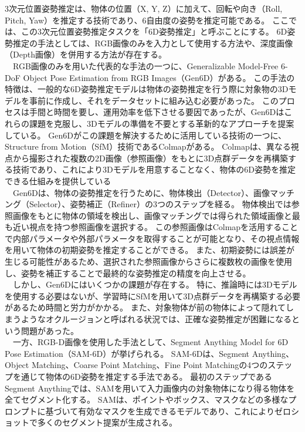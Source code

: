 3次元位置姿勢推定は、物体の位置（X, Y, Z）に加えて、回転や向き（Roll, Pitch, Yaw）を推定する技術であり、6自由度の姿勢を推定可能である。
ここでは、この3次元位置姿勢推定タスクを「6D姿勢推定」と呼ぶことにする。
6D姿勢推定の手法としては、RGB画像のみを入力として使用する方法や、深度画像（Depth画像）を併用する方法が存在する。\\
　RGB画像のみを用いた代表的な手法の一つに、Generalizable Model-Free 6-DoF Object Pose Estimation from RGB Images（Gen6D）がある。
この手法の特徴は、一般的な6D姿勢推定モデルは物体の姿勢推定を行う際に対象物の3Dモデルを事前に作成し、それをデータセットに組み込む必要があった。
このプロセスは手間と時間を要し、運用効率を低下させる要因であったが、Gen6Dはこれらの課題を克服し、3Dモデルの準備を不要とする革新的なアプローチを提案している。
Gen6Dがこの課題を解決するために活用している技術の一つに、Structure from Motion（SfM）技術であるColmapがある。
Colmapは、異なる視点から撮影された複数の2D画像（参照画像）をもとに3D点群データを再構築する技術であり、これにより3Dモデルを用意することなく、物体の6D姿勢を推定できる仕組みを提供している\\
　Gen6Dは、物体の姿勢推定を行うために、物体検出（Detector）、画像マッチング（Selector）、姿勢補正（Refiner）の3つのステップを経る。
物体検出では参照画像をもとに物体の領域を検出し、画像マッチングでは得られた領域画像と最も近い視点を持つ参照画像を選択する。
この参照画像はColmapを活用することで内部パラメータや外部パラメータを取得することが可能となり、その視点情報を用いて物体の初期姿勢を推定することができる。
また、初期姿勢には誤差が生じる可能性があるため、選択された参照画像からさらに複数枚の画像を使用し、姿勢を補正することで最終的な姿勢推定の精度を向上させる。\\
　しかし、Gen6Dにはいくつかの課題が存在する。
特に、推論時には3Dモデルを使用する必要はないが、学習時にSfMを用いて3D点群データを再構築する必要があるため時間と労力がかかる。
また、対象物体が前の物体によって隠れてしまうようなオクルージョンと呼ばれる状況では、正確な姿勢推定が困難になるという問題があった。\\
　一方、RGB-D画像を使用した手法として、Segment Anything Model for 6D Pose Estimation（SAM-6D）が挙げられる。
SAM-6Dは、Segment Anything、Object Matching、Coarse Point Matching、Fine Point Matchingの4つのステップを通じて物体の6D姿勢を推定する手法である。
最初のステップであるSegment Anythingでは、SAMを用いて入力画像内の対象物体になり得る物体を全てセグメント化する。
SAMは、ポイントやボックス、マスクなどの多様なプロンプトに基づいて有効なマスクを生成できるモデルであり、これによりゼロショットで多くのセグメント提案が生成される。
